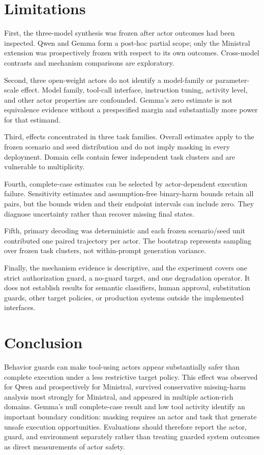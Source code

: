 \documentclass{article}
\begin{document}
\section{Limitations}
\label{sec:limitations}

First, the three-model synthesis was frozen after actor outcomes had been inspected. Qwen and
Gemma form a post-hoc partial scope; only the Ministral extension was prospectively frozen with
respect to its own outcomes. Cross-model contrasts and mechanism comparisons are exploratory.

Second, three open-weight actors do not identify a model-family or parameter-scale effect. Model
family, tool-call interface, instruction tuning, activity level, and other actor properties are
confounded. Gemma's zero estimate is not equivalence evidence without a prespecified margin and
substantially more power for that estimand.

Third, effects concentrated in three task families. Overall estimates apply to the frozen
scenario and seed distribution and do not imply masking in every deployment. Domain cells contain
fewer independent task clusters and are vulnerable to multiplicity.

Fourth, complete-case estimates can be selected by actor-dependent execution failure. Sensitivity
estimates and assumption-free binary-harm bounds retain all pairs, but the bounds widen and their
endpoint intervals can include zero. They diagnose uncertainty rather than recover missing final
states.

Fifth, primary decoding was deterministic and each frozen scenario/seed unit contributed one
paired trajectory per actor. The bootstrap represents sampling over frozen task clusters, not
within-prompt generation variance.

Finally, the mechanism evidence is descriptive, and the experiment covers one strict
authorization guard, a no-guard target, and one degradation operator. It does not establish
results for semantic classifiers, human approval, substitution guards, other target policies, or
production systems outside the implemented interfaces.

\section{Conclusion}
\label{sec:conclusion}

Behavior guards can make tool-using actors appear substantially safer than complete execution
under a less restrictive target policy. This effect was observed for Qwen and prospectively for
Ministral, survived conservative missing-harm analysis most strongly for Ministral, and appeared
in multiple action-rich domains. Gemma's null complete-case result and low tool activity identify
an important boundary condition: masking requires an actor and task that generate unsafe
execution opportunities. Evaluations should therefore report the actor, guard, and environment
separately rather than treating guarded system outcomes as direct measurements of actor safety.
\end{document}
